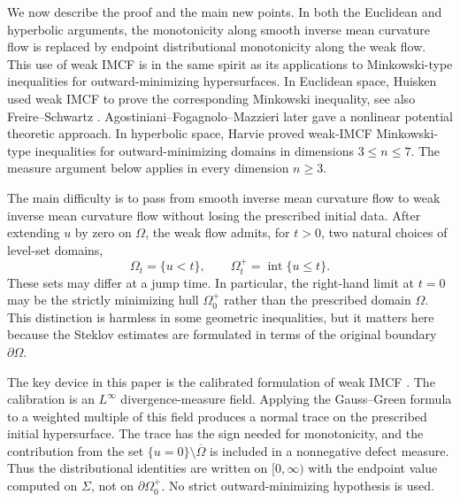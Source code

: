 \documentclass[10pt,a4paper]{amsart}
\numberwithin{equation}{section}
\begin{document}
We now describe the proof and the main new points.  In both the Euclidean and hyperbolic arguments, the monotonicity along smooth inverse mean curvature flow is replaced by endpoint distributional monotonicity along the weak flow.  This use of weak IMCF is in the same spirit as its applications to Minkowski-type inequalities for outward-minimizing hypersurfaces.  In Euclidean space, Huisken \cite{Huisken2009Lecture} used weak IMCF to prove the corresponding Minkowski inequality, see also Freire--Schwartz \cite{FS2014}.  Agostiniani--Fogagnolo--Mazzieri \cite{AFM2022} later gave a nonlinear potential theoretic approach.  In hyperbolic space, Harvie \cite{Harvie2026} proved weak-IMCF Minkowski-type inequalities for outward-minimizing domains in dimensions $3\leq n\leq7$.  The measure argument below applies in every dimension $n\geq3$.

The main difficulty is to pass from smooth inverse mean curvature
flow to weak inverse mean curvature flow without losing the
prescribed initial data. After extending $u$ by zero on $\Omega$,
the weak flow admits, for $t>0$, two natural choices of level-set
domains,
\begin{equation*}
    \Omega_t=\{u<t\},
    \qquad
    \Omega_t^+=\operatorname{int}\{u\leq t\}.
\end{equation*}
These sets may differ at a jump time. In particular, the
right-hand limit at $t=0$ may be the strictly minimizing hull
$\Omega_0^+$ rather than the prescribed domain $\Omega$. This
distinction is harmless in some geometric inequalities, but it
matters here because the Steklov estimates are formulated in terms
of the original boundary $\partial\Omega$.

The key device in this paper is the calibrated formulation of weak IMCF \cite[Section~3]{HI2001}.  The calibration is an $L^\infty$ divergence-measure field.  Applying the Gauss--Green formula to a weighted multiple of this field produces a normal trace on the prescribed initial hypersurface.  The trace has the sign needed for monotonicity, and the contribution from the set $\{u=0\}\setminus\overline\Omega$ is included in a nonnegative defect measure.  Thus the distributional identities are written on $[0,\infty)$ with the endpoint value computed on $\Sigma$, not on $\partial\Omega_0^+$. No strict outward-minimizing hypothesis is used.
\end{document}
